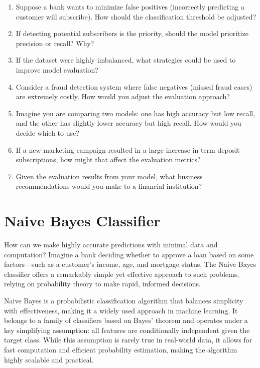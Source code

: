 \documentclass[
  11pt,
]{book}
\providecommand{\tightlist}{%
  \setlength{\itemsep}{0pt}\setlength{\parskip}{0pt}}
\theoremstyle{definition}
\theoremstyle{definition}
\theoremstyle{definition}
\theoremstyle{definition}
\theoremstyle{remark}
\begin{document}
\begin{enumerate}
\def\labelenumi{\arabic{enumi}.}
\setcounter{enumi}{35}
\tightlist
\item
  Suppose a bank wants to minimize false positives (incorrectly predicting a customer will subscribe). How should the classification threshold be adjusted?\\
\item
  If detecting potential subscribers is the priority, should the model prioritize precision or recall? Why?\\
\item
  If the dataset were highly imbalanced, what strategies could be used to improve model evaluation?\\
\item
  Consider a fraud detection system where false negatives (missed fraud cases) are extremely costly. How would you adjust the evaluation approach?\\
\item
  Imagine you are comparing two models: one has high accuracy but low recall, and the other has slightly lower accuracy but high recall. How would you decide which to use?\\
\item
  If a new marketing campaign resulted in a large increase in term deposit subscriptions, how might that affect the evaluation metrics?\\
\item
  Given the evaluation results from your model, what business recommendations would you make to a financial institution?
\end{enumerate}

\chapter{Naive Bayes Classifier}\label{chapter-bayes}

How can we make highly accurate predictions with minimal data and computation? Imagine a bank deciding whether to approve a loan based on some factors---such as a customer's income, age, and mortgage status. The Naive Bayes classifier offers a remarkably simple yet effective approach to such problems, relying on probability theory to make rapid, informed decisions.

Naive Bayes is a probabilistic classification algorithm that balances simplicity with effectiveness, making it a widely used approach in machine learning. It belongs to a family of classifiers based on Bayes' theorem and operates under a key simplifying assumption: all features are conditionally independent given the target class. While this assumption is rarely true in real-world data, it allows for fast computation and efficient probability estimation, making the algorithm highly scalable and practical.
\end{document}
